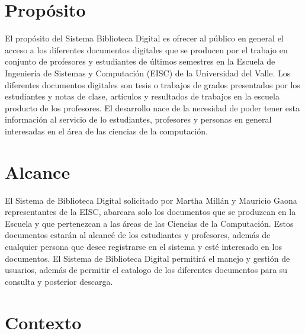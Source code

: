 \documentclass[]{article}
\begin{document}
\newpage
\tableofcontents
\newpage
        
\section{Propósito}
El propósito del Sistema Biblioteca Digital es ofrecer al público en general el acceso a los
diferentes documentos digitales que se producen por el trabajo en conjunto de profesores y
estudiantes de últimos semestres en la Escuela de Ingeniería de Sistemas y Computación (EISC) de la
Universidad del Valle.
Los diferentes documentos digitales son tesis o trabajos de grados presentados por los estudiantes
y notas de clase, artículos y resultados de trabajos en la escuela producto de los profesores.
El desarrollo nace de la necesidad de poder tener esta información al servicio de lo estudiantes,
profesores y personas en general interesadas en el área de las ciencias de la computación.

\section{Alcance}
El Sistema de Biblioteca Digital solicitado por Martha Millán  y Mauricio Gaona representantes de
la EISC, abarcara solo los documentos que se produzcan en la Escuela y que pertenezcan a las áreas
de las Ciencias de la Computación. Estos documentos estarán al alcancé de los estudiantes y
profesores, además de cualquier persona que desee registrarse en el sistema y esté interesado en
los documentos. 
El Sistema de Biblioteca Digital permitirá el manejo  y gestión de usuarios, además de permitir el
catalogo de los diferentes documentos para su consulta y posterior descarga.

\section{Contexto}
\end{document}
